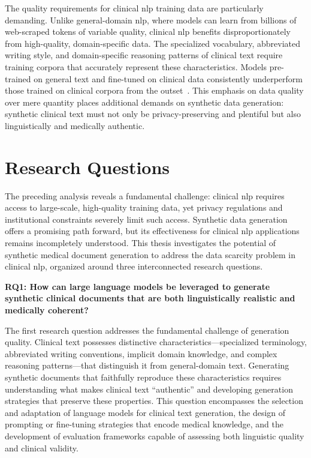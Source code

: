The quality requirements for clinical \gls{nlp} training data are particularly demanding. Unlike general-domain \gls{nlp}, where models can learn from billions of web-scraped tokens of variable quality, clinical \gls{nlp} benefits disproportionately from high-quality, domain-specific data. The specialized vocabulary, abbreviated writing style, and domain-specific reasoning patterns of clinical text require training corpora that accurately represent these characteristics. Models pre-trained on general text and fine-tuned on clinical data consistently underperform those trained on clinical corpora from the outset~\citep{gu2021domain}. This emphasis on data quality over mere quantity places additional demands on synthetic data generation: synthetic clinical text must not only be privacy-preserving and plentiful but also linguistically and medically authentic.
\section{Research Questions}

The preceding analysis reveals a fundamental challenge: clinical \gls{nlp} requires access to large-scale, high-quality training data, yet privacy regulations and institutional constraints severely limit such access. Synthetic data generation offers a promising path forward, but its effectiveness for clinical \gls{nlp} applications remains incompletely understood. This thesis investigates the potential of synthetic medical document generation to address the data scarcity problem in clinical \gls{nlp}, organized around three interconnected research questions.

\textbf{RQ1: How can large language models be leveraged to generate synthetic clinical documents that are both linguistically realistic and medically coherent?}

The first research question addresses the fundamental challenge of generation quality. Clinical text possesses distinctive characteristics---specialized terminology, abbreviated writing conventions, implicit domain knowledge, and complex reasoning patterns---that distinguish it from general-domain text. Generating synthetic documents that faithfully reproduce these characteristics requires understanding what makes clinical text ``authentic'' and developing generation strategies that preserve these properties. This question encompasses the selection and adaptation of language models for clinical text generation, the design of prompting or fine-tuning strategies that encode medical knowledge, and the development of evaluation frameworks capable of assessing both linguistic quality and clinical validity.

